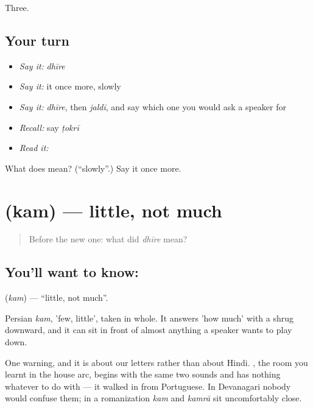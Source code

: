 \begin{grammarlens}[title={What you've built}]
Three.
\end{grammarlens}

\subsection*{Your turn}
\begin{itemize}
\raggedright
  \item \emph{Say it:} \emph{dhīre}
  \item \emph{Say it:} it once more, slowly
  \item \emph{Say it:} \emph{dhīre}, then \emph{jaldī}, and say which one you would ask a speaker for
  \item \emph{Recall:} say \emph{ṭokrī}
  \item \emph{Read it:} \textbf{}
\end{itemize}

\begin{tcolorbox}[breakable,colback=teal!4,colframe=teal!35!black,title={Before you move on}]
What does  mean? (\textquotedblleft{}slowly\textquotedblright{}.) Say it once more.
\end{tcolorbox}
\section[\texorpdfstring{\hi{कम} (kam)}{कम (kam)}]{ (kam) — little, not much}

\label{lesson:HI-C64-little}



\begin{quote}
Before the new one: what did \emph{dhīre} mean?
\end{quote}

\subsection*{You'll want to know: }
\textbf{} (\emph{kam}) — \textquotedblleft{}little, not much\textquotedblright{}.

Persian \emph{kam}, 'few, little', taken in whole. It answers 'how much' with a shrug downward, and it can sit in front of almost anything a speaker wants to play down.

One warning, and it is about our letters rather than about Hindi. , the room you learnt in the house arc, begins with the same two sounds and has nothing whatever to do with  — it walked in from Portuguese. In Devanagari nobody would confuse them; in a romanization \emph{kam} and \emph{kamrā} sit uncomfortably close.

